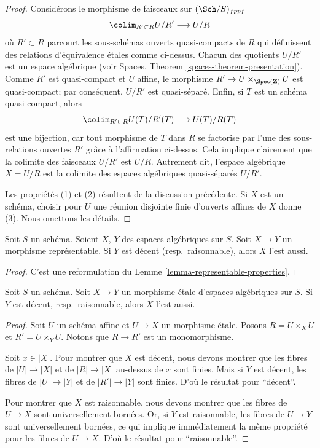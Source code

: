 \begin{proof}
\medskip\noindent
Considérons le morphisme de faisceaux sur $(\Sch/S)_{fppf}$
$$
\colim_{R' \subset R} U/R' \longrightarrow U/R
$$
où $R' \subset R$ parcourt les sous-schémas ouverts quasi-compacts de $R$
qui définissent des relations d'équivalence étales comme ci-dessus.
Chacun des quotients $U/R'$ est un espace algébrique
(voir Spaces, Theorem \ref{spaces-theorem-presentation}).
Comme $R'$ est quasi-compact et $U$ affine, le morphisme
$R' \to U \times_{\Spec(\mathbf{Z})} U$ est quasi-compact;
par conséquent, $U/R'$ est quasi-séparé. Enfin, si $T$ est un schéma
quasi-compact, alors
$$
\colim_{R' \subset R} U(T)/R'(T) \longrightarrow U(T)/R(T)
$$
est une bijection, car tout morphisme de $T$ dans $R$ se factorise par l'une
des sous-relations ouvertes $R'$ grâce à l'affirmation ci-dessus. Cela
implique clairement que la colimite des faisceaux $U/R'$ est $U/R$. Autrement
dit, l'espace algébrique $X = U/R$ est la colimite des espaces algébriques
quasi-séparés $U/R'$.

\medskip\noindent
Les propriétés (1) et (2) résultent de la discussion précédente.
Si $X$ est un schéma, choisir pour $U$ une réunion disjointe finie d'ouverts
affines de $X$ donne (3).
Nous omettons les détails.
\end{proof}

\begin{lemma}
\label{lemma-representable-named-properties}
Soit $S$ un schéma. Soient $X$, $Y$ des espaces algébriques sur $S$.
Soit $X \to Y$ un morphisme représentable.
Si $Y$ est décent (resp.\ raisonnable), alors $X$ l'est aussi.
\end{lemma}

\begin{proof}
C'est une reformulation du Lemme \ref{lemma-representable-properties}.
\end{proof}

\begin{lemma}
\label{lemma-etale-named-properties}
Soit $S$ un schéma. Soit $X \to Y$ un morphisme étale d'espaces
algébriques sur $S$. Si $Y$ est décent, resp.\ raisonnable,
alors $X$ l'est aussi.
\end{lemma}

\begin{proof}
Soit $U$ un schéma affine et $U \to X$ un morphisme étale.
Posons $R = U \times_X U$ et $R' = U \times_Y U$. Notons que
$R \to R'$ est un monomorphisme.

\medskip\noindent
Soit $x \in |X|$. Pour montrer que $X$ est décent, nous devons montrer que
les fibres de $|U| \to |X|$ et de $|R| \to |X|$ au-dessus de $x$ sont finies.
Mais si $Y$ est décent, les fibres de $|U| \to |Y|$ et de
$|R'| \to |Y|$ sont finies. D'où le résultat pour ``décent''.

\medskip\noindent
Pour montrer que $X$ est raisonnable, nous devons montrer que les fibres de
$U \to X$ sont universellement bornées. Or, si $Y$ est raisonnable, les fibres
de $U \to Y$ sont universellement bornées, ce qui implique immédiatement la
même propriété pour les fibres de $U \to X$.
D'où le résultat pour ``raisonnable''.
\end{proof}







